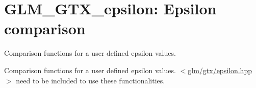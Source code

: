 \hypertarget{group__gtx__epsilon}{\section{\-G\-L\-M\-\_\-\-G\-T\-X\-\_\-epsilon\-: \-Epsilon comparison}
\label{group__gtx__epsilon}
}


\-Comparison functions for a user defined epsilon values.  


\-Comparison functions for a user defined epsilon values. $<$\hyperlink{epsilon_8hpp}{glm/gtx/epsilon.\-hpp}$>$ need to be included to use these functionalities. 